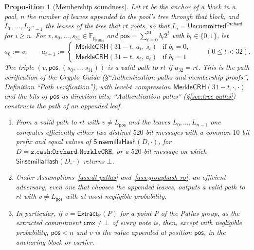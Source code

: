 \documentclass[11pt,a4paper]{article}
\newtheorem{proposition}[theorem]{Proposition}
\theoremstyle{definition}
\newcommand{\F}{\mathbb{F}}
\newcommand{\PP}{\mathbb{P}}
\newcommand{\cmx}{\mathsf{cmx}}
\newcommand{\Pallas}{\ensuremath{\mathsf{Pallas}}}
\newcommand{\Extract}{\ensuremath{\mathsf{Extract}}}
\begin{document}
\begin{proposition}[Membership soundness]\label{prop:membership}
Let $\mathit{rt}$ be the anchor of a block in a pool, $n$ the number of
leaves appended to the pool's tree through that block, and
$L_0, \dots, L_{2^{32}-1}$ the leaves of the tree that $\mathit{rt}$ roots,
so that $L_i = \mathsf{Uncommitted}^{\mathsf{Orchard}}$ for $i \ge n$. For
$v, s_0, \dots, s_{31} \in \F_{p_{\Pallas}}$ and
$\mathsf{pos} = \sum_{t=0}^{31} b_t 2^t$ with $b_t \in \{0, 1\}$, let
\begin{equation}\label{eq:tree-fold}
  a_0 := v, \qquad
  a_{t+1} :=
  \begin{cases}
    \mathsf{MerkleCRH}(31 - t,\, a_t,\, s_t) & \text{if } b_t = 0, \\
    \mathsf{MerkleCRH}(31 - t,\, s_t,\, a_t) & \text{if } b_t = 1
  \end{cases}
  \qquad (0 \le t < 32).
\end{equation}
The triple $(v, \mathsf{pos}, (s_0, \dots, s_{31}))$ is a \emph{valid path
to} $\mathit{rt}$ if $a_{32} = \mathit{rt}$. This is the path verification
of the \emph{Crypto Guide} (\S``Authentication paths and membership
proofs'', Definition ``Path verification''), with level-$t$ compression
$\mathsf{MerkleCRH}(31 - t, \cdot, \cdot)$ and the bits of $\mathsf{pos}$ as
direction bits; ``Authentication paths'' (\S\ref{sec:tree-paths}) constructs
the path of an appended leaf.
\begin{enumerate}
\item[(i)] From a valid path to $\mathit{rt}$ with $v \neq L_{\mathsf{pos}}$
  and the leaves $L_0, \dots, L_{n-1}$ one computes efficiently either two
  distinct $520$-bit messages with a common $10$-bit prefix and equal values
  of $\mathsf{SinsemillaHash}(D, \cdot)$, for
  $D = \texttt{z.cash:Orchard-MerkleCRH}$, or a $520$-bit message on which
  $\mathsf{SinsemillaHash}(D, \cdot)$ returns $\bot$.
\item[(ii)] Under Assumptions~\ref{ass:dl-pallas}
  and~\ref{ass:grouphash-ro}, an efficient adversary, even one that chooses
  the appended leaves, outputs a valid path to $\mathit{rt}$ with
  $v \neq L_{\mathsf{pos}}$ with at most negligible probability.
\item[(iii)] In particular, if $v = \Extract_{\PP}(P)$ for a point $P$ of
  the Pallas group, as the extracted commitment $\cmx \neq \bot$ of every
  note is, then, except with negligible probability, $\mathsf{pos} < n$ and
  $v$ is the value appended at position $\mathsf{pos}$, in the anchoring
  block or earlier.
\end{enumerate}
\end{proposition}
\end{document}
